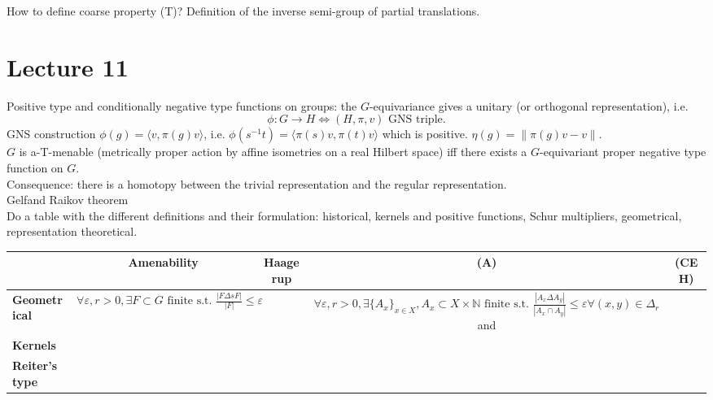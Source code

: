 How to define coarse property (T)? Definition of the inverse semi-group of partial translations.
\section{Lecture 11}
Positive type and conditionally negative type functions on groups: the $G$-equivariance gives a unitary (or orthogonal representation), i.e.
\[\phi: G\rightarrow H \iff (H,\pi,v) \text{ GNS triple}.\] 
GNS construction $\phi(g) = \langle v,\pi(g)v\rangle$, i.e. $\phi(s^{-1}t) = \langle \pi(s)v,\pi(t)v\rangle$ which is positive. $\eta(g)= \|\pi(g)v -v\|$. \\

$G$ is a-T-menable (metrically proper action by affine isometries on a real Hilbert space) iff there exists a $G$-equivariant proper negative type function on $G$.\\

Consequence: there is a homotopy between the trivial representation and the regular representation.\\

Gelfand Raikov theorem\\

Do a table with the different definitions and their formulation: historical, kernels and positive functions, Schur multipliers, geometrical, representation theoretical.

\begin{table}[h]
\begin{tabular}{c|c|c|c|c|}
\cline{2-5}
                                                         & \textbf{Amenability} & \textbf{Haagerup} & \textbf{(A)}            & \textbf{(CEH)}  \\ \hline
\multicolumn{1}{|l|}{\textbf{Geometrical}}                   &  $\forall \varepsilon, r>0, \exists F\subset G \text{ finite s.t. 	}\frac{|F\Delta s F|}{|F|}\leq \varepsilon$  &                   & $\forall \varepsilon, r>0, \exists \{A_x\}_{x\in X}, A_x\subset X\times \mathbb N \text{ finite s.t. 	}\frac{|A_x\Delta A_y|}{|A_x\cap A_y|}\leq \varepsilon \forall (x,y)\in \Delta_r$ and                 &                       \\ \hline
\multicolumn{1}{|l|}{\textbf{Kernels}}                   &                     &                   &                      &                       \\ \hline
\multicolumn{1}{|l|}{\textbf{Reiter's type}}                   &                     &                   &                      &                       \\ \hline
\hline
\end{tabular}
\end{table} 

